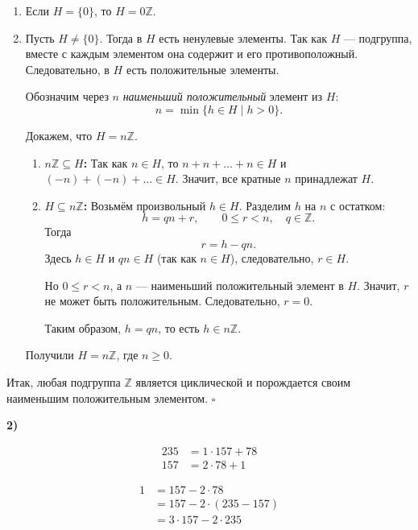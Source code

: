 \documentclass[12pt,a4paper]{article}
\newcommand{\soli}[1]{%
  \par\vspace{0.15\baselineskip}%
  \noindent\textbf{#1)}\ %
  \ignorespaces                     %
}
\begin{document}
\begin{enumerate}
    \item Если $H = \{0\}$, то $H = 0\mathbb{Z}$.
    
    \item Пусть $H \neq \{0\}$. Тогда в $H$ есть ненулевые элементы. Так как $H$ — подгруппа, вместе с каждым элементом она содержит и его противоположный. Следовательно, в $H$ есть положительные элементы.
    
    Обозначим через $n$ \emph{наименьший положительный} элемент из $H$:
    \[
    n = \min\{ h \in H \mid h > 0 \}.
    \]
    
    Докажем, что $H = n\mathbb{Z}$.
    
    \begin{enumerate}
	\item \textbf{$n\mathbb{Z} \subseteq H$:} Так как $n \in H$, то $n + n + \dots + n \in H$ и $(-n) + (-n) + \dots \in H$. Значит, все кратные $n$ принадлежат $H$.
    
	\item \textbf{$H \subseteq n\mathbb{Z}$:} Возьмём произвольный $h \in H$. Разделим $h$ на $n$ с остатком:
	\[
	h = qn + r, \qquad 0 \leqslant r < n, \quad q \in \mathbb{Z}.
	\]
	Тогда
	\[
	r = h - qn.
	\]
	Здесь $h \in H$ и $qn \in H$ (так как $n \in H$), следовательно, $r \in H$.
    
	Но $0 \leqslant r < n$, а $n$ — наименьший положительный элемент в $H$. Значит, $r$ не может быть положительным. Следовательно, $r = 0$.
    
	Таким образом, $h = qn$, то есть $h \in n\mathbb{Z}$.
    \end{enumerate} 
    Получили $H = n\mathbb{Z}$, где $n \geqslant 0$. 
\end{enumerate}




Итак, любая подгруппа $\mathbb{Z}$ является циклической и порождается своим наименьшим положительным элементом. \hfill $\square$

\newpage

\soli{2}
\[
\begin{aligned}
    235 &= 1 \cdot 157 + 78 \\
    157 &= 2 \cdot 78 + 1
\end{aligned}
\]

\[
\begin{aligned}
    1 &= 157 - 2 \cdot 78 \\
      &= 157 - 2 \cdot (235 - 157) \\
      &= 3 \cdot 157 - 2 \cdot 235
\end{aligned}
\]
\end{document}
